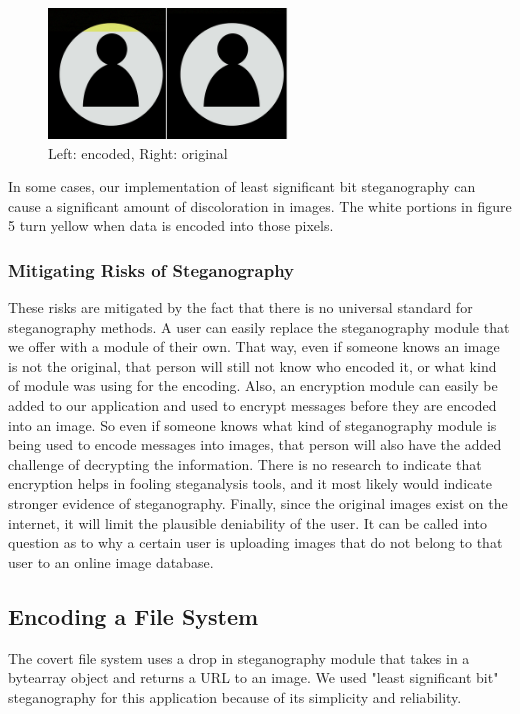 \begin{figure}[h]
	\includegraphics[width=2.5in]{comparison}
	\caption{Left: encoded, Right: original}
\end{figure}
In some cases, our implementation of least significant bit steganography can cause a significant amount of discoloration in images. The white portions in figure 5 turn yellow when data is encoded into those pixels. 

\subsubsection{Mitigating Risks of Steganography}
These risks are mitigated by the fact that there is no universal standard for steganography methods. A user can easily replace the steganography module that we offer with a module of their own. That way, even if someone knows an image is not the original, that person will still not know who encoded it, or what kind of module was using for the encoding. Also, an encryption module can easily be added to our application and used to encrypt messages before they are encoded into an image. So even if someone knows what kind of steganography module is being used to encode messages into images, that person will also have the added challenge of decrypting the information. There is no research to indicate that encryption helps in fooling steganalysis tools, and it most likely would indicate stronger evidence of steganography. Finally, since the original images exist on the internet, it will limit the plausible deniability of the user. It can be called into question as to why a certain user is uploading images that do not belong to that user to an online image database. 

\subsection{Encoding a File System}

The covert file system uses a drop in steganography module that takes in a bytearray object and returns a URL to an image. We used "least significant bit" steganography for this application because of its simplicity and reliability.

